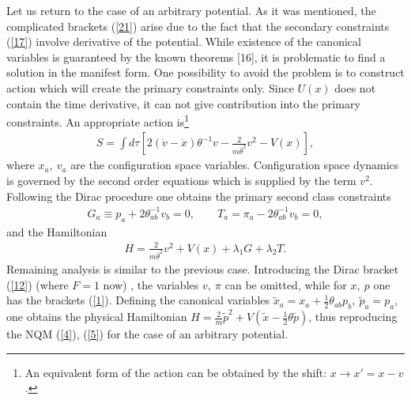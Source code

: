 \documentclass[paper a4]{article}
\begin{document}
Let us return to the case of an arbitrary potential. As it was mentioned,
the complicated brackets (\ref{21}) arise due to the fact that the
secondary constraints (\ref{17}) involve derivative of the potential.
While existence of the canonical variables is guaranteed
by the known theorems [16], it is problematic to find a solution in the
manifest form.
One possibility to avoid the problem is to construct action which will
create the primary constraints only. Since $U(x)$ does not contain
the time derivative, it can not give contribution into the primary
constraints. An appropriate action is\footnote{An equivalent form of
the action can be obtained by the shift: $x \to x'=x-v$.}
\begin{eqnarray}\label{25}
S=\int d\tau\left[2(\dot v-\dot x)\theta^{-1}v-\frac{2}{m\bar\theta^2}v^2-
V(x)\right],
\end{eqnarray}
where $x_a, ~ v_a$ are the configuration space variables. Configuration
space dynamics is governed by the
second order equations which is supplied
by the term $v^2$.
Following the Dirac procedure one obtains the primary second
class constraints
\begin{eqnarray}\label{26}
G_a\equiv p_a+2\theta^{-1}_{ab}v_b=0, \qquad
T_{a}=\pi_a-2\theta^{-1}_{ab}v_b=0,
\end{eqnarray}
and the Hamiltonian
\begin{eqnarray}\label{27}
H=\frac{2}{m\bar\theta^2}v^2+V(x)+\lambda_1G+\lambda_2T.
\end{eqnarray}
Remaining analysis is similar to the previous case.
Introducing the Dirac bracket (\ref{12}) (where $F=1$ now) , the
variables $v, ~ \pi$ can
be omitted, while for $x, ~ p$ one has the brackets (\ref{1}). Defining
the canonical variables
$\tilde x_a=x_a+\frac{1}{2}\theta_{ab}p_b, ~ \tilde p_a=p_a$,
one obtains the physical Hamiltonian
$H=\frac{2}{m}\tilde p^2+V(\tilde x-\frac{1}{2}\theta\tilde p)$,
thus reproducing the NQM (\ref{4}), (\ref{5}) for the case of an
arbitrary potential.
\end{document}
